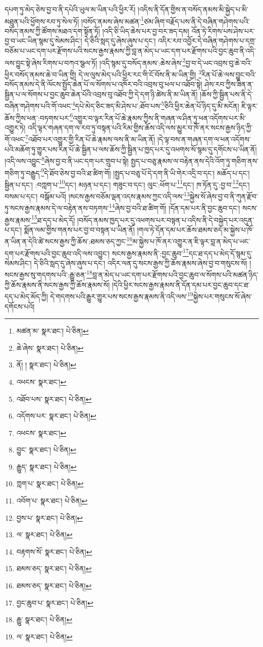 དཔག་ཏུ་མེད་ཅེས་བྱ་བ་ནི་དཔེའི་ཡུལ་མ་ཡིན་པའི་ཕྱིར་རོ། །འདིས་ནི་དོན་གྱིས་ན་བསོད་ནམས་མི་སྐྱེད་པ་མི་མཐུན་པའི་ཕྱོགས་རབ་ཏུ་སེལ་ཏོ། །བསོད་ནམས་ཞེས་མཚན་\footnote{མཚན་མ་  སྣར་ཐང་།  པེ་ཅིན། }ཙམ་ཞིག་བརྗོད་པས་ནི་དེ་བཞིན་གཤེགས་པའི་བསོད་ནམས་ཀྱི་ཚོགས་མཐའ་དག་སྟོན་ཏོ། །འདི་ཅི་ཡིད་ཆེས་པར་བྱ་བར་ཟད་དམ། འོན་ཏེ་རིགས་པས་ཤེས་པར་བྱ་བ་ཡང་ཡིན་སྙམ་དུ་སེམས་ཤིང་། དེ་ཅིའི་སླད་དུ་ཞེས་ཞུས་པ་དང་། འདིར་རབ་འབྱོར་དེ་བཞིན་གཤེགས་པ་དགྲ་བཅོམ་པ་ཡང་དག་པར་རྫོགས་པའི་སངས་རྒྱས་རྣམས་ཀྱི་བླ་ན་མེད་པ་ཡང་དག་པར་རྫོགས་པའི་བྱང་ཆུབ་ནི་འདི་ལས་བྱུང་སྟེ་ཞེས་རིགས་པ་བཀའ་སྩལ་ཏོ། །འདི་སྙམ་དུ་བསོད་ནམས་:ཆེས་ཞེས་\footnote{ཆེ་ཞེས་  སྣར་ཐང་།  པེ་ཅིན། }བྱ་བ་དེ་ཡང་འབྲས་བུ་ཆེ་བའི་ཕྱིར་བསོད་ནམས་ཆེ་བ་ཡིན་གྱི། དེ་ལ་ལུས་མེད་པའི་ཕྱིར་རང་གི་ངོ་བོས་ནི་མ་ཡིན་གྱི། \footnote{ནོ། །   སྣར་ཐང་།  པེ་ཅིན། }རིན་པོ་ཆེ་ལས་བྱུང་བའི་བསོད་ནམས་དེ་ནི་ལོངས་སྤྱོད་ཆེན་པོ་ལ་སོགས་པ་འཁོར་བའི་འབྲས་བུ་ཕལ་པ་འཐོབ་སྟེ། ཤེས་རབ་ཀྱིས་ཟིན་ན་སྦྱིན་པ་ལ་སོགས་པ་བྱང་ཆུབ་ཆེན་པོའི་འབྲས་བུ་འཐོབ་ཀྱི་དེ་དག་ཉི་ཚེས་ནི་མ་ཡིན་ནོ། །ཆོས་ཀྱི་སྦྱིན་པས་ནི་དེ་བཞིན་གཤེགས་པའི་གོ་འཕང་\footnote{འཕངས་  སྣར་ཐང་། }དཔེ་མེད་ཅིང་ཟད་མི་ཤེས་པ་:ཐོབ་པས་\footnote{འཐོབ་པས་  སྣར་ཐང་།  པེ་ཅིན། }ཅིའི་ཕྱིར་ཆེན་པོ་ཉིད་དུ་མི་མངོན། ཇི་ལྟར་ཆོས་ཀྱིས་ཕན་:བཏགས་པར་\footnote{འདོགས་པར་  སྣར་ཐང་།  པེ་ཅིན། }འགྱུར་བ་ལྟར་རིན་པོ་ཆེ་རྣམས་ཀྱིས་ནི་གཞན་ལ་ཤིན་ཏུ་ཕན་འདོགས་པར་མི་འགྱུར་ཏེ། འདི་ལྟར་གཞན་དག་ལ་རབ་ཏུ་བསྟན་པའི་རིམ་གྱིས་ཆོས་འདི་ལས་མྱུར་བ་ཁོ་ནར་སངས་རྒྱས་ཉིད་ཀྱི་གོ་འཕང་\footnote{འཕངས་  སྣར་ཐང་། }འཐོབ་པར་འགྱུར་གྱི་རིན་པོ་ཆེ་རྣམས་ལས་ནི་མ་ཡིན་ནོ། །དེ་ལྟ་བས་ན་གཞན་དག་ལ་ཕན་འདོགས་པའི་མཆོག་ཏུ་གྱུར་པས་རིན་པོ་ཆེ་སྦྱིན་པ་ལས་ཆོས་ཀྱི་སྦྱིན་པ་ཁྱད་པར་དུ་འཕགས་སོ་སྙམ་དུ་དགོངས་པ་ཡིན་ནོ། །འདི་ལས་འབྱུང་\footnote{བྱུང་  སྣར་ཐང་།  པེ་ཅིན། }ཞེས་བྱ་བ་ནི་ཡང་དག་པར་གྲུབ་པ་སྟེ། སྤྱད་པ་བཅུ་རྣམས་ལ་བརྟེན་ནས་དེའི་འོག་ཏུ་གཅིག་ནས་གཅིག་ཏུ་བརྒྱུད་\footnote{རྒྱུད་  སྣར་ཐང་།  པེ་ཅིན། }དེ་ཐོབ་ཅེས་བྱ་བའི་ཐ་ཚིག་གོ། །སྤྱད་པ་བཅུ་པོ་དེ་དག་ནི་ཡི་གེར་འདྲི་བ་དང་། མཆོད་པ་དང་། སྦྱིན་པ་དང་། :བཀླག་པ་\footnote{ཀླག་པ་  སྣར་ཐང་།  པེ་ཅིན། }དང་། མཉན་པ་དང་། གཟུང་བ་དང་། ལུང་:ཕོག་པ་\footnote{འབོག་པ་  སྣར་ཐང་།  པེ་ཅིན། }དང་། ཁ་ཏོན་དུ་:བྱ་བ་\footnote{བྱས་པ་  སྣར་ཐང་།  པེ་ཅིན། }དང་། བསམ་པ་དང་། བསྒོམ་པའོ། །སངས་རྒྱས་བཅོམ་ལྡན་འདས་རྣམས་ཀྱང་འདི་ལས་\footnote{ལ་  སྣར་ཐང་།  པེ་ཅིན། }སྐྱེས་སོ་ཞེས་བྱ་བ་ནི་ཀུན་རྫོབ་ཏུ་སངས་རྒྱས་རྣམས་དེ་ལ་བརྟེན་ནས་བཏགས་\footnote{བརྟགས་སོ་  སྣར་ཐང་།  པེ་ཅིན། }ཞེས་བྱ་བའི་ཐ་ཚིག་གོ། །དོན་དམ་པར་ནི་བྱང་ཆུབ་དང་། སངས་རྒྱས་རྣམས་\footnote{ཐམས་ཅད་  སྣར་ཐང་།  པེ་ཅིན། }ཐ་དད་པ་མེད་དོ། །བསོད་ནམས་ཁྱད་པར་དུ་འཕགས་པར་བསྟན་པ་འདིས་ནི་དེ་བསྐྱེད་པར་འདུན་པ་དང་། སྨོན་ལམ་གྱིས་གནས་པར་བྱ་བ་བསྟན་པ་ཡིན་ནོ། །གལ་ཏེ་དོན་དམ་པར་ཆོས་ཐམས་ཅད་མ་སྐྱེས་པ་ཁོ་ན་ཡིན་ན་དེའི་ཚེ་སངས་རྒྱས་ཀྱི་ཆོས་:ཐམས་ཅད་ཀྱང་\footnote{ཐམས་ཅད་  སྣར་ཐང་།  པེ་ཅིན། }མ་སྐྱེས་པ་ཁོ་ནར་འགྱུར་ན་ཇི་ལྟར་བླ་ན་མེད་པ་ཡང་དག་པར་རྫོགས་པའི་བྱང་ཆུབ་འདི་ལས་འབྱུང་། སངས་རྒྱས་རྣམས་ནི་:བྱང་ཆུབ་\footnote{བྱང་ཆུབ་པ་  སྣར་ཐང་།  པེ་ཅིན། }དང་ཐ་དད་པ་མེད་དོ་སྙམ་དུ་སེམས་ཤིང་། དེ་ཅིའི་སླད་དུ་ཞེས་ཞུས་པ་དང་། འདིར་ལན་དུ་སངས་རྒྱས་ཀྱི་ཆོས་རྣམས་ཞེས་བྱ་བ་གསུངས་སོ། །སངས་རྒྱས་སུ་གདགས་པའི་:རྒྱུ་ཅན་\footnote{རྒྱུ་  སྣར་ཐང་།  པེ་ཅིན། }བླ་ན་མེད་པ་ཡང་དག་པར་རྫོགས་པའི་བྱང་ཆུབ་ལ་སོགས་པའི་མཚན་ཉིད་ཀྱི་ཆོས་རྣམས་ནི་སངས་རྒྱས་ཀྱི་ཆོས་རྣམས་སོ། །དེའི་ཕྱིར་སངས་རྒྱས་རྣམས་ནི་དོན་དམ་པར་བྱང་ཆུབ་དང་ཐ་དད་པ་མེད་མོད་ཀྱི། དེ་གདགས་པའི་རྒྱུར་གྱུར་པས་སངས་རྒྱས་རྣམས་ནི་འདི་ལས་\footnote{ལ་  སྣར་ཐང་།  པེ་ཅིན། }སྐྱེས་པར་གསུངས་སོ་ཞེས་དགོངས་པའོ། 